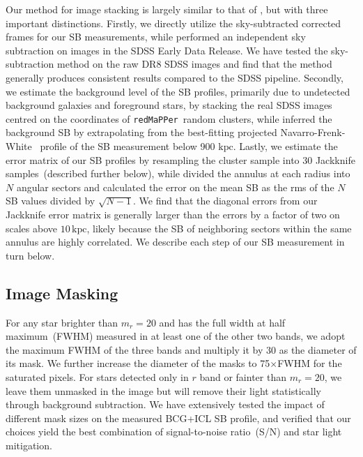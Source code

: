 \documentclass[fleqn,usenatbib]{mnras}
\newcommand{\kpc}{\mathrm{kpc}}
\newcommand\redmapper{\texttt{redMaPPer}}
\begin{document}
Our method for image stacking is largely similar to that of
\citep[hereafter referred to as ]{Zibetti2005}, but
with three important distinctions. Firstly, we directly utilize the
sky-subtracted corrected frames for our SB measurements, while
 performed an independent sky subtraction on images
in the SDSS Early Data Release. We have tested the 
sky-subtraction method on the raw DR8 SDSS images and find that the
 method generally produces consistent results
compared to the SDSS pipeline.  Secondly, we estimate the background level
of the SB profiles, primarily due to undetected background galaxies and
foreground stars, by stacking the real SDSS images centred on the
coordinates of \redmapper~random clusters, while 
inferred the background SB by extrapolating from the best-fitting projected
Navarro-Frenk-White~\citep[NFW;][]{NFW1997} profile of the SB
measurement below 900 $\kpc$. Lastly, we estimate the error matrix of our
SB profiles by resampling the cluster sample into 30 Jackknife
samples~(described further below), while  divided
the annulus at each radius into $N$ angular sectors and calculated the
error on the mean SB as the rms of the $N$ SB values divided by
$\sqrt{N{-}1}$. We find that the diagonal errors from our Jackknife error
matrix is generally larger than the  errors by a
factor of two on scales above $10\,\kpc$, likely because the SB of
neighboring sectors within the same annulus are highly correlated.  We
describe each step of our SB measurement in turn below.


\subsection{Image Masking}
\label{subsec:mask}

For any star brighter than $m_r{=}20$ and has the full width at half
maximum~(FWHM) measured in at least one of the other two bands, we adopt
the maximum FWHM of the three bands and multiply it by 30 as the diameter
of its mask. We further increase the diameter of the masks to
75$\times$FWHM for the saturated pixels. For stars detected only in $r$
band or fainter than $m_r{=}20$, we leave them unmasked in the image but will
remove their light statistically through background subtraction. We have
extensively tested the impact of different mask sizes on the measured
BCG+ICL SB profile, and verified that our choices yield the best
combination of signal-to-noise ratio~(S/N) and star light mitigation.
\end{document}
